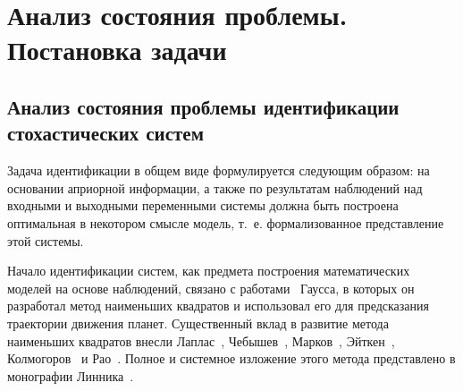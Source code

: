 \chapter[Анализ состояния проблемы. Постановка задачи]{%
  Анализ состояния проблемы. \hspace{2cm}
  Постановка задачи
}

\section[Анализ состояния проблемы идентификации стохастических систем]{%
  Анализ состояния проблемы идентификации \\
  стохастических систем
}

Задача идентификации в общем виде формулируется следующим образом:
на основании априорной информации, а также по результатам наблюдений над
входными и выходными переменными системы должна быть построена оптимальная в
некотором смысле модель, т.~е. формализованное представление этой системы.

Начало идентификации систем, как предмета построения математических моделей на основе наблюдений,
связано с работами~\cite{gauss_1809, gauss_1810, gauss_1821} Гаусса,
в которых он разработал метод наименьших квадратов и использовал его для предсказания
траектории движения планет. Существенный вклад в развитие метода наименьших квадратов внесли
Лаплас~\cite{laplace_1812}, Чебышев~\cite{chebyshev_1859}, Марков~\cite{markov_1898},
Эйткен~\cite{aitken_1935}, Колмогоров~\cite{kolmogorov_1946} и Рао~\cite{rao_1946}.
Полное и системное изложение этого метода представлено в монографии Линника~\cite{linnik62}.






